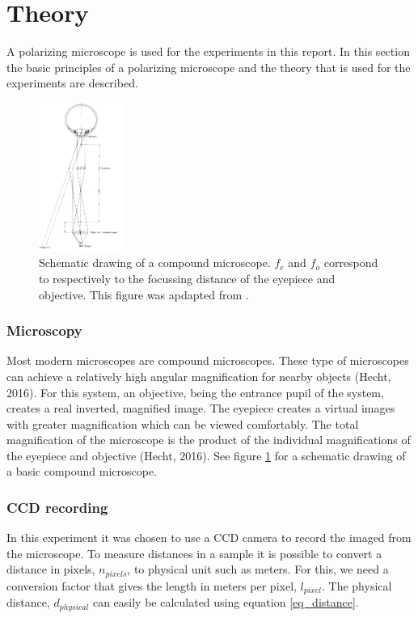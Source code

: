 \section{Theory}

A polarizing microscope is used for the experiments in this report. In this section the basic principles of a polarizing microscope and the theory that is used for the experiments are described.

\begin{figure}
    \includegraphics[width=0.25\textwidth]{afbeeldingen/compound_microscope.png}
  	\caption{Schematic drawing of a compound microscope. $f_{e}$ and $f_{o}$ correspond to respectively to the focussing distance of the eyepiece and objective. This figure was apdapted from \cite{hecht}.}
  	\label{fig_compound_microscope}
\end{figure} 

\subsubsection{Microscopy}

Most modern microscopes are compound microscopes. These type of microscopes can achieve a relatively high angular magnification for nearby objects (Hecht, 2016). For this system, an objective, being the entrance pupil of the system, creates a real inverted, magnified image. The eyepiece creates a virtual images with greater magnification which can be viewed comfortably. The total magnification of the microscope is the product of the individual magnifications of the eyepiece and objective (Hecht, 2016). See figure \ref{fig_compound_microscope} for a schematic drawing of a basic compound microscope. 



\subsubsection{CCD recording}
In this experiment it was chosen to use a CCD camera to record the imaged from the microscope. To measure distances in a sample it is possible to convert a distance in pixels, $n_{pixels}$, to physical unit such as meters. For this, we need a conversion factor that gives the length in meters per pixel, $l_{pixel}$. The physical distance, $d_{physical}$ can easily be calculated using equation \ref{eq_distance}.

